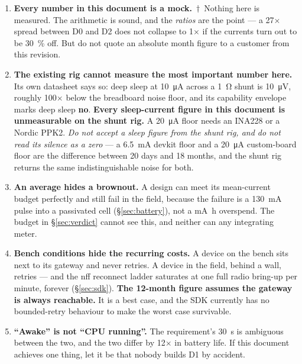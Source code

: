 \documentclass[11pt,a4paper]{article}
\newcommand{\no}{\textcolor{warn}{\textbf{no}}}
\newcommand{\mock}{\textcolor{warn}{$\dagger$}}
\begin{document}
\begin{enumerate}[leftmargin=*,label=\textbf{L\arabic*.}]
  \item \textbf{Every number in this document is a mock.}\ \mock\ Nothing here is measured. The
        arithmetic is sound, and the \emph{ratios} are the point --- a \num{27}$\times$ spread
        between D0 and D2 does not collapse to \num{1}$\times$ if the currents turn out to be
        \SI{30}{\percent} off. But do not quote an absolute month figure to a customer from this
        revision.

  \item \textbf{The existing rig cannot measure the most important number here.} Its own datasheet
        says so: deep sleep at \SI{10}{\micro\ampere} across a \SI{1}{\ohm} shunt is
        \SI{10}{\micro\volt}, roughly \num{100}$\times$ below the breadboard noise floor, and its
        capability envelope marks deep sleep \no. \textbf{Every sleep-current figure in this
        document is unmeasurable on the shunt rig.} A \SI{20}{\micro\ampere} floor needs an INA228
        or a Nordic PPK2. \emph{Do not accept a sleep figure from the shunt rig, and do not read
        its silence as a zero} --- a \SI{6.5}{\milli\ampere} devkit floor and a
        \SI{20}{\micro\ampere} custom-board floor are the difference between 20 days and 18
        months, and the shunt rig returns the same indistinguishable noise for both.

  \item \textbf{An average hides a brownout.} A design can meet its mean-current budget perfectly
        and still fail in the field, because the failure is a \SI{130}{\milli\ampere} pulse into a
        passivated cell (\S\ref{sec:battery}), not a \si{\milli\ampere\hour} overspend. The budget
        in \S\ref{sec:verdict} cannot see this, and neither can any integrating meter.

  \item \textbf{Bench conditions hide the recurring costs.} A device on the bench sits next to its
        gateway and never retries. A device in the field, behind a wall, retries --- and the nff
        reconnect ladder saturates at one full radio bring-up per minute, forever
        (\S\ref{sec:sdk}). \textbf{The 12-month figure assumes the gateway is always reachable.}
        It is a best case, and the SDK currently has no bounded-retry behaviour to make the worst
        case survivable.

  \item \textbf{``Awake'' is not ``CPU running''.} The requirement's \SI{30}{\second} is ambiguous
        between the two, and the two differ by \num{12}$\times$ in battery life. If this document
        achieves one thing, let it be that nobody builds D1 by accident.
\end{enumerate}
\end{document}
